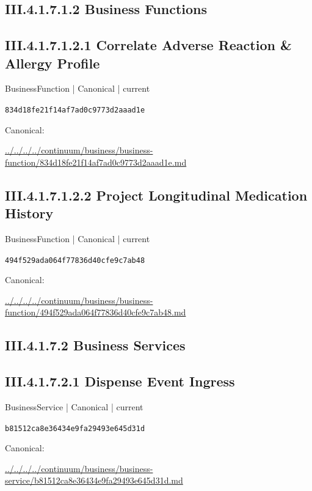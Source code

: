 \documentclass[10pt,a4paper]{article}
\begin{document}
\subsection*{III.4.1.7.1.2 Business Functions}
\subsection*{III.4.1.7.1.2.1 Correlate Adverse Reaction \& Allergy Profile}
\label{element-834d18fe21f14af7ad0c9773d2aaad1e}
{\small BusinessFunction | Canonical | current}\par
\texttt{834d18fe21f14af7ad0c9773d2aaad1e}\par
Canonical: \par
{\footnotesize\url{../../../../continuum/business/business-function/834d18fe21f14af7ad0c9773d2aaad1e.md}}\par
\subsection*{III.4.1.7.1.2.2 Project Longitudinal Medication History}
\label{element-494f529ada064f77836d40cfe9c7ab48}
{\small BusinessFunction | Canonical | current}\par
\texttt{494f529ada064f77836d40cfe9c7ab48}\par
Canonical: \par
{\footnotesize\url{../../../../continuum/business/business-function/494f529ada064f77836d40cfe9c7ab48.md}}\par
\subsection*{III.4.1.7.2 Business Services}
\subsection*{III.4.1.7.2.1 Dispense Event Ingress}
\label{element-b81512ca8e36434e9fa29493e645d31d}
{\small BusinessService | Canonical | current}\par
\texttt{b81512ca8e36434e9fa29493e645d31d}\par
Canonical: \par
{\footnotesize\url{../../../../continuum/business/business-service/b81512ca8e36434e9fa29493e645d31d.md}}\par
\end{document}
